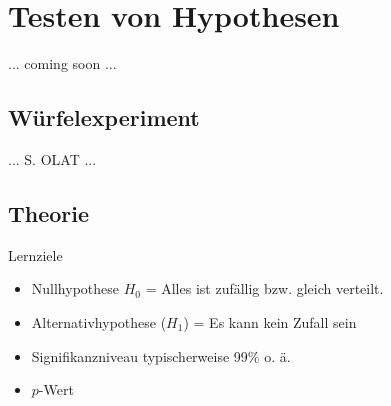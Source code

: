 
\section{Testen von Hypothesen}

... coming soon ...


\subsection{Würfelexperiment}

... S. OLAT ...


\subsection{Theorie}

Lernziele

\begin{itemize}
\item Nullhypothese $H_0$ = Alles ist zufällig bzw. gleich verteilt.

\item Alternativhypothese ($H_1$) = Es kann kein Zufall sein

\item Signifikanzniveau typischerweise 99\% o. ä.

\item $p$-Wert
  
\end{itemize}


\newpage
